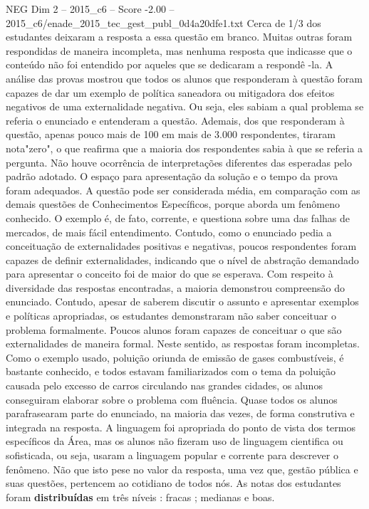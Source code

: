 \begin{textsample}{NEG Dim 2 – 2015\_c6 – Score -2.00 – 2015\_c6/enade\_2015\_tec\_gest\_publ\_0d4a20dfe1.txt}
Cerca de 1/3 dos estudantes deixaram a resposta a essa questão em branco.
Muitas outras foram respondidas de maneira incompleta, mas nenhuma resposta que indicasse que o conteúdo não foi entendido por aqueles que se dedicaram a respondê -la.
A análise das provas mostrou que todos os alunos que responderam à questão foram capazes de dar um exemplo de política saneadora ou mitigadora dos efeitos negativos de uma externalidade negativa.
Ou seja, eles sabiam a qual problema se referia o enunciado e entenderam a questão.
Ademais, dos que responderam à questão, apenas pouco mais de 100 em mais de 3.000 respondentes, tiraram nota"zero", o que reafirma que a maioria dos respondentes sabia à que se referia a pergunta.
Não houve ocorrência de interpretações diferentes das esperadas pelo padrão adotado.
O espaço para apresentação da solução e o tempo da prova foram adequados.
A questão pode ser considerada média, em comparação com as demais questões de Conhecimentos Específicos, porque aborda um fenômeno conhecido.
O exemplo é, de fato, corrente, e questiona sobre uma das falhas de mercados, de mais fácil entendimento.
Contudo, como o enunciado pedia a conceituação de externalidades positivas e negativas, poucos respondentes foram capazes de definir externalidades, indicando que o nível de abstração demandado para apresentar o conceito foi de maior do que se esperava.
Com respeito à diversidade das respostas encontradas, a maioria demonstrou compreensão do enunciado.
Contudo, apesar de saberem discutir o assunto e apresentar exemplos e políticas apropriadas, os estudantes demonstraram não saber conceituar o problema formalmente.
Poucos alunos foram capazes de conceituar o que são externalidades de maneira formal.
Neste sentido, as respostas foram incompletas.
Como o exemplo usado, poluição oriunda de emissão de gases combustíveis, é bastante conhecido, e todos estavam familiarizados com o tema da poluição causada pelo excesso de carros circulando nas grandes cidades, os alunos conseguiram elaborar sobre o problema com fluência.
Quase todos os alunos parafrasearam parte do enunciado, na maioria das vezes, de forma construtiva e integrada na resposta.
A linguagem foi apropriada do ponto de vista dos termos específicos da Área, mas os alunos não fizeram uso de linguagem cientifica ou sofisticada, ou seja, usaram a linguagem popular e corrente para descrever o fenômeno.
Não que isto pese no valor da resposta, uma vez que, gestão pública e suas questões, pertencem ao cotidiano de todos nós.
As notas dos estudantes foram \textbf{distribuídas} em três níveis : fracas ; medianas e boas.

\end{textsample}
